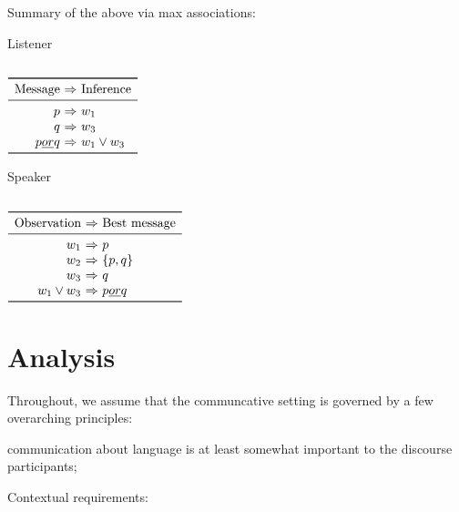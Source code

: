 \documentclass{article}
\begin{document}
\begin{examples}
\item Summary of the above via max associations:

  \begin{minipage}[t]{0.45\linewidth}
    Listener

    \vspace{-2pt}
  
    $\begin{array}[t]{r @{ \ \Rightarrow \ } l}
      \toprule
      \text{Message} & \text{Inference} \\
      \midrule
      p &  w_{1}\\
      q & w_{3} \\
      p \word{ or } q & w_{1} \vee w_{3} \\
      \bottomrule
    \end{array}$
  \end{minipage}
  \hfill
  \begin{minipage}[t]{0.45\linewidth}
    Speaker

    \vspace{-2pt}

    $\begin{array}[t]{r @{ \ \Rightarrow \ } l}
      \toprule
      \text{Observation} & \text{Best message} \\
      \midrule
      w_{1} & p \\
      w_{2} & \set{p, q} \\
      w_{3} & q  \\      
      w_{1} \vee w_{3} & p \word{ or } q \\
      \bottomrule
    \end{array}$
  \end{minipage}    
\end{examples}


\section{Analysis}\label{sec:analysis}


Throughout, we
assume that the communcative setting is governed by a few overarching
principles: 

 communication about language is at least somewhat
important to the discourse participants; 

Contextual requirements: 
\end{document}
